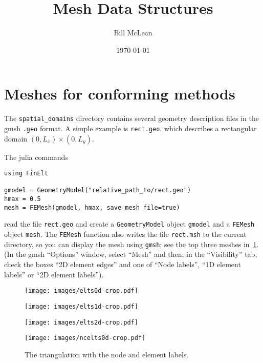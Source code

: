 \documentclass[a4paper,10pt]{article}
\title{Mesh Data Structures}
\author{Bill McLean}
\date{\today}
\begin{document}
\maketitle
\section{Meshes for conforming methods}
The \texttt{spatial\_domains} directory contains several geometry description 
files in the gmsh \texttt{.geo} format.  A simple example is \texttt{rect.geo},
which describes a rectangular domain $(0,L_x)\times(0,L_y)$.

The julia commands
\begin{lstlisting}
using FinElt

gmodel = GeometryModel("relative_path_to/rect.geo")
hmax = 0.5
mesh = FEMesh(gmodel, hmax, save_mesh_file=true)
\end{lstlisting}
read the file \texttt{rect.geo} and create a \texttt{GeometryModel} object 
\texttt{gmodel} and a \texttt{FEMesh} object \texttt{mesh}.  The 
\texttt{FEMesh} function also writes the file \texttt{rect.msh} to the
current directory, so you can display the mesh using \texttt{gmsh}; see  
the top three meshes in~\cref{fig: elts}.  (In the gmsh ``Options'' window,
select ``Mesh'' and then, in the ``Visibility'' tab, check the boxes ``2D
element edges'' and one of ``Node labels'', ``1D element labels'' or ``2D
element labels'').

\begin{figure}
\caption{The triangulation with the node and element labels.}\label{fig: elts}
\begin{center}
\texttt{[image: images/elts0d-crop.pdf]}
\end{center}
\vspace{0.1cm}
\begin{center}
\texttt{[image: images/elts1d-crop.pdf]}
\end{center}
\vspace{0.1cm}
\begin{center}
\texttt{[image: images/elts2d-crop.pdf]}
\end{center}
\vspace{0.1cm}
\begin{center}
\texttt{[image: images/ncelts0d-crop.pdf]}
\end{center}
\end{figure}
\end{document}
